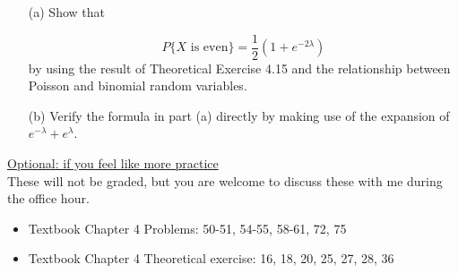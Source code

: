 \documentclass[11pt]{article}
\begin{document}
\begin{itemize}
    \begin{itemize}
    \item[(a)] Show that 
    
    $$
    P\{X \,\, \text{is even}\} = \frac{1}{2}(1 + e^{-2\lambda})
    $$
    by using the result of Theoretical Exercise 4.15 and the relationship between Poisson and binomial random variables.
    
    \item[(b)] Verify the formula in part (a) directly by making use of the expansion of $e^{-\lambda} + e^{\lambda}$. 
    \end{itemize}



\end{itemize}

\vspace{12pt}

\underline{Optional: if you feel like more practice}\\
These will not be graded, but you are welcome to discuss these with me during the office hour.

\begin{itemize}


\item Textbook  Chapter 4 Problems: 50-51, 54-55, 58-61, 72, 75
\item Textbook  Chapter 4 Theoretical exercise: 16, 18, 20, 25, 27, 28, 36

\end{itemize}
\end{document}
